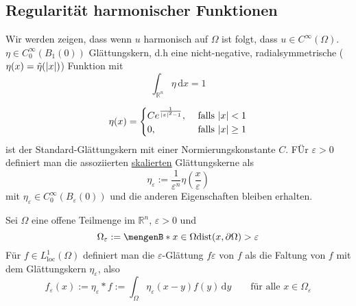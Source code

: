 \subsection{Regularität harmonischer Funktionen} 
\label{sub:regularitat_harmonischer_funktionen}
Wir werden zeigen, dass wenn $u$ harmonisch auf $\Omega$ ist folgt, dass $u \in C^{\infty}(\Omega)$.
$\eta \in C^{\infty}_0(B_1(0))$ Glättungskern, d.h eine nicht-negative, radialsymmetrische ($\eta(x)=\tilde\eta(\lvert x\rvert)$) Funktion mit
\[
	\int_{\mathbb{R}^n}^{}\eta \,\mathrm{d}x = 1
\]	
\begin{beispiel}
	\begin{equation}
		\eta(x) = \begin{cases}
			C e^{\frac{1}{\lvert x\rvert^2-1}}, &\text{ falls }\lvert x\rvert<1\\
			0 , &\text{ falls }\lvert x\rvert\geq 1\\
		\end{cases}
	\end{equation}
	ist der Standard-Glättungskern mit einer Normierungskonstante $C$. FÜr $\varepsilon > 0$ definiert man die assoziierten \underline{skalierten} Glättungskerne als
	\[
		\eta_{\varepsilon}:= \frac{1}{\varepsilon^n}\eta \left( \frac{x}{\varepsilon} \right)
	\]
	mit $\eta_{\varepsilon} \in C_0^{\infty}(B_{\varepsilon}(0))$ und die anderen Eigenschaften bleiben erhalten.
\end{beispiel}
\begin{definition}
	Sei $\Omega$ eine offene Teilmenge im $\mathbb{R}^n$, $\varepsilon >0$ und \[
		\Omega_{\varepsilon} := \set[x \in \Omega]{\dist(x,\partial \Omega)> \varepsilon}
	\]Für $f \in L^1_{\text{loc}}(\Omega)$ definiert man die $\varepsilon$-Glättung $f \varepsilon$ von $f$ als die Faltung von $f$ mit dem Glättungskern $\eta_{\varepsilon}$, also
	\[
		f_{\varepsilon}(x):= \eta_{\varepsilon} * f := \int_{\Omega}^{}\eta_{\varepsilon}(x-y)f(y) \,\mathrm{d}y \qquad \text{für alle }x \in \Omega_{\varepsilon}
	\]
\end{definition}
\cleardoubleoddemptypage
{}
\setcounter{page}{1}

